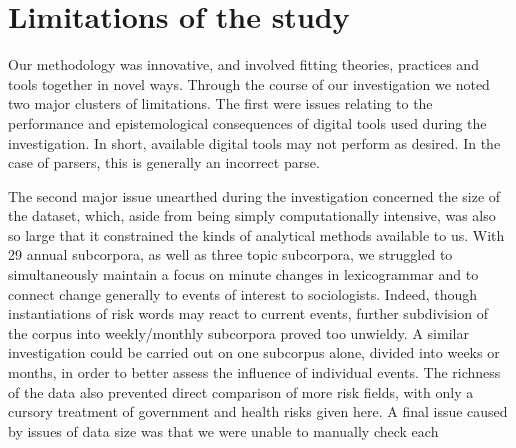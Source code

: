
\chapter{Limitations of the study}

	Our methodology was innovative, and involved fitting theories, practices and tools together in novel ways. Through the course of our investigation we noted two major clusters of limitations. The first were issues relating to the performance and epistemological consequences of digital tools used during the investigation. In short, available digital tools may not perform as desired. In the case of parsers, this is generally an incorrect parse. 


	The second major issue unearthed during the investigation concerned the size of the dataset, which, aside from being simply computationally intensive, was also so large that it constrained the kinds of analytical methods available to us. With 29 annual subcorpora, as well as three topic subcorpora, we struggled to simultaneously maintain a focus on minute changes in lexicogrammar and to connect change generally to events of interest to sociologists. Indeed, though instantiations of risk words may react to current events, further subdivision of the corpus into weekly/monthly subcorpora proved too unwieldy. A similar investigation could be carried out on one subcorpus alone, divided into weeks or months, in order to better assess the influence of individual events. The richness of the data also prevented direct comparison of more risk fields, with only a cursory treatment of government and health risks given here. A final issue caused by issues of data size was that we were unable to manually check each


